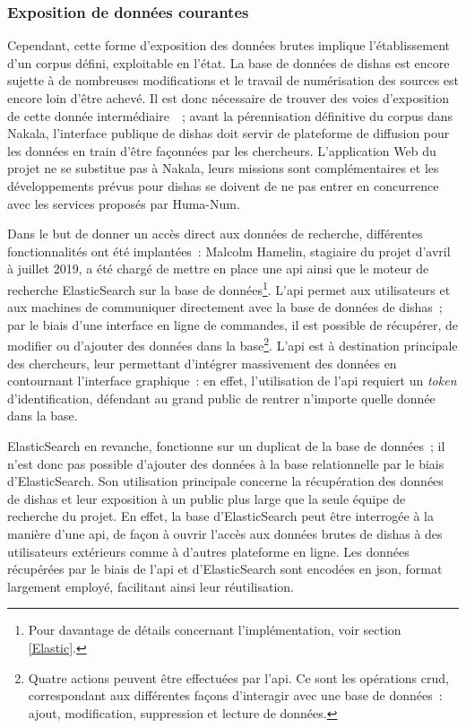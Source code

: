 \documentclass[a4paper,12pt,twoside]{book}
\newcommand{\eng}{\emph}
\newcommand{\bdd}{base de données\xspace}
\newcommand{\g}[1]{\og#1~\fg}
\newcommand{\dishas}{\gls{dishas}\xspace}
\newcommand{\api}{\gls{api}\xspace}
\newcommand{\json}{\gls{json}\xspace}
\newcommand{\crud}{\gls{crud}\xspace}
\begin{document}
			\subsubsection{Exposition de données courantes}
Cependant, cette forme d'exposition des données brutes implique l'établissement d'un corpus défini, exploitable en l'état. La \bdd de \dishas est encore sujette à de nombreuses modifications et le travail de numérisation des sources est encore loin d'être achevé. Il est donc nécessaire de trouver des voies d'exposition de cette donnée \g{intermédiaire}~; avant la pérennisation définitive du corpus dans Nakala, l'interface publique de \dishas doit servir de plateforme de diffusion pour les données en train d'être façonnées par les chercheurs. L'application Web du projet ne se substitue pas à Nakala, leurs missions sont complémentaires et les développements prévus pour \dishas se doivent de ne pas entrer en concurrence avec les services proposés par Huma-Num.

Dans le but de donner un accès direct aux données de recherche, différentes fonctionnalités ont été implantées~: Malcolm Hamelin, stagiaire du projet d'avril à juillet 2019, a été chargé de mettre en place une \api ainsi que le moteur de recherche ElasticSearch sur la \bdd\footnote{Pour davantage de détails concernant l'implémentation, voir section \ref{Elastic}.}. L'\api permet aux utilisateurs et aux machines de communiquer directement avec la \bdd de \dishas~; par le biais d'une interface en ligne de commandes, il est possible de récupérer, de modifier ou d'ajouter des données dans la base\footnote{Quatre actions peuvent être effectuées par l'\api. Ce sont les opérations \crud, correspondant aux différentes façons d'interagir avec une \bdd~: ajout, modification, suppression et lecture de données.}. L'\api est à destination principale des chercheurs, leur permettant d'intégrer massivement des données en contournant l'interface graphique~: en effet, l'utilisation de l'\api requiert un \eng{token} d'identification, défendant au grand public de rentrer n'importe quelle donnée dans la base.

ElasticSearch en revanche, fonctionne sur un duplicat de la \bdd~; il n'est donc pas possible d'ajouter des données à la base relationnelle par le biais d'ElasticSearch. Son utilisation principale concerne la récupération des données de \dishas et leur exposition à un public plus large que la seule équipe de recherche du projet. En effet, la base d'ElasticSearch peut être interrogée à la manière d'une \api, de façon à ouvrir l'accès aux données brutes de \dishas à des utilisateurs extérieurs comme à d'autres plateforme en ligne. Les données récupérées par le biais de l'\api et d'ElasticSearch sont encodées en \json, format largement employé, facilitant ainsi leur réutilisation.
\end{document}
